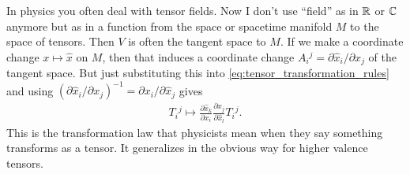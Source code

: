 \documentclass[english, 12pt]{article}
\begin{document}
In physics you often deal with tensor fields.
Now I don't use \enquote{field} as in \(\mathbb{R}\) or \(\mathbb{C}\) anymore but as in a function from the space or spacetime manifold \(M\) to the space of tensors.
Then \(V\) is often the tangent space to \(M\).
If we make a coordinate change \(x \mapsto \hat x\) on \(M\), then that induces a coordinate change \(A{}_i{}^j = \partial \hat x_i / \partial x_j\) of the tangent space.
But just substituting this into \cref{eq:tensor_transformation_rules} and using \(\left(\partial \hat x_i / \partial x_j\right)^{-1} = \partial x_i / \partial \hat x_j \) gives
\begin{align*}
	T{}_i{}^j \mapsto \frac{\partial \hat x_k}{\partial x_i} \frac{\partial x_j}{\partial \hat x_l} T{}_i{}^j.
\end{align*}
This is the transformation law that physicists mean when they say something transforms as a tensor.
It generalizes in the obvious way for higher valence tensors.
\end{document}
